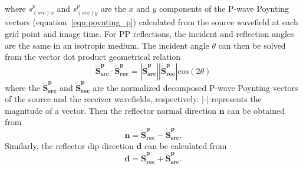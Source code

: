 \documentclass[manuscript,ulem,graphix,revised]{geophysics}
\begin{document}
where $s^{p}_{(src)x}$ and $s^{p}_{(src)y}$ are the $x$ and $y$ components of the P-wave Poynting vectors (equation~\ref{eqn:poynting_p}) calculated from the source wavefield at each grid point and image time. For PP reflections, the incident and reflection angles are the same in an isotropic medium. The incident angle $\theta$ can then be solved from the vector dot product geometrical relation \citep{du17,shabelansky17,zhu17}
\begin{equation}
\mathbf{\tilde{S}^{p}_{src}}\cdot \mathbf{\tilde{S}^p_{rec}}=|\mathbf{\tilde{S}^{p}_{src}}||\mathbf{\tilde{S}^p_{rec}}|\mathrm{cos}(2\theta)
\label{eqn:inc_agl}
\end{equation}
where the $\mathbf{\tilde{S}^{p}_{src}}$ and $\mathbf{\tilde{S}^p_{rec}}$ are the normalized decomposed P-wave Poynting vectors of the source and the receiver wavefields, respectively. $|\cdot|$ represents the magnitude of a vector. Then the reflector normal direction $\mathbf{n}$ can be obtained from
\begin{equation}
\mathbf{n}=\mathbf{\tilde{S}^p_{rec}}-\mathbf{\tilde{S}^{p}_{src}}.
\end{equation}
Similarly, the reflector dip direction $\mathbf{d}$ can be calculated from
\begin{equation}
\mathbf{d}=\mathbf{\tilde{S}^p_{rec}}+\mathbf{\tilde{S}^{p}_{src}}.
\end{equation}
 
\end{document}

